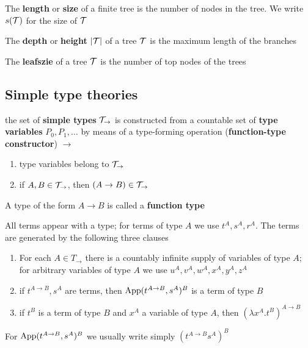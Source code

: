 \documentclass[11pt]{article}
\begin{document}
\begin{definition}[]
The \textbf{length} or \textbf{size} of a finite tree is the number of nodes in the tree. We
write \(s(\mathcal{T})\) for the size of \(\mathcal{T}\)

The \textbf{depth} or \textbf{height} \(\abs{\calt}\) of a tree \(\mathcal{T}\) is the maximum
length of the branches

The \textbf{leafszie} of a tree \(\mathcal{T}\) is the number of top nodes of the trees
\end{definition}


\subsection{Simple type theories}
\label{sec:org306fa3e}
\begin{definition}
the set of \textbf{simple types} \(\mathcal{T}_\to\) is constructed from a countable set
of \textbf{type variables} \(P_0,P_1,\dots\) by means of a type-forming operation
(\textbf{function-type constructor}) \(\to\)
\begin{enumerate}
\item type variables belong to \(\mathcal{T}_\to\)
\item if \(A,B\in\mathcal{T}_\to\), then \((A\to B)\in\mathcal{T}_\rightarrow\)
\end{enumerate}


A type of the form \(A\to B\) is called a \textbf{function type}
\end{definition}

\begin{definition}
All terms appear with a type; for terms of type \(A\) we use \(t^A,s^A,r^A\). The
terms are generated by the following three clauses
\begin{enumerate}
\item For each \(A\in T_\to\) there is a countably infinite supply of variables of
type \(A\); for arbitrary variables of type \(A\) we use
\(u^A,v^A,w^A,x^A,y^A,z^A\)
\item if \(t^{A\to B},s^A\) are terms, then \(\text{App}(t^{A\to B},s^A)^B\) is a term of
type \(B\)
\item if \(t^B\) is a term of type \(B\) and \(x^A\) a variable of type \(A\), then
\((\lambda x^A.t^B)^{A\to B}\)
\end{enumerate}
\end{definition}
For \(\text{App}(t^{A\to B},s^A)^B\) we usually write simply \((t^{A\to B}s^A)^B\)
\end{document}
